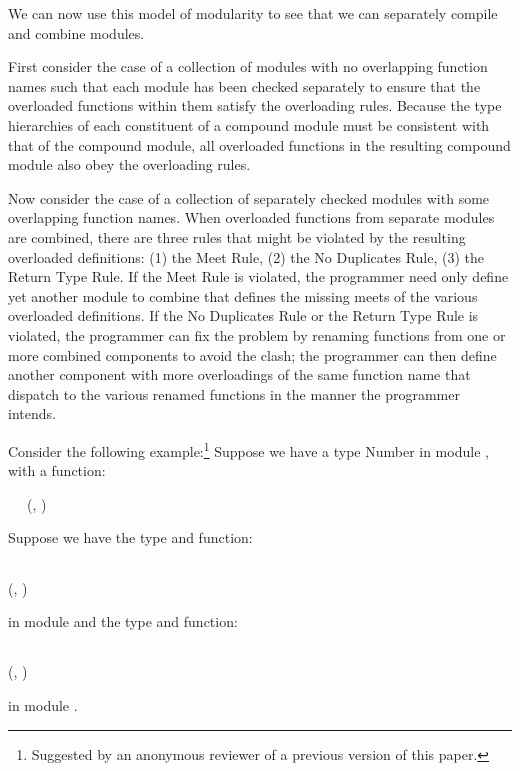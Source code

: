 \documentclass[10pt]{sigplanconf}
\begin{document}
We can now use this model of modularity to see 
that we can separately compile and combine modules.

First consider the case of a collection of modules with no overlapping function names
such that each module has been checked separately 
to ensure that the overloaded functions within them satisfy the overloading rules.
Because the type hierarchies of each constituent of a compound module 
must be consistent with that of the compound module, 
all overloaded functions in the resulting compound module
also obey the overloading rules.

Now consider the case of a collection of separately checked modules 
with some overlapping function names.
When overloaded functions from separate modules are combined, 
there are three rules that might be violated
by the resulting overloaded definitions: 
(1) the Meet Rule, (2) the No Duplicates Rule, (3) the Return Type Rule.
If the Meet Rule is violated, 
the programmer need only define yet another module to combine 
that defines the missing meets of the various overloaded definitions.
If the No Duplicates Rule or the Return Type Rule is violated, 
the programmer can fix the problem by renaming functions 
from one or more combined components to avoid the clash; 
the programmer can then define another component 
with more overloadings of the same function name 
that dispatch to the various renamed functions in the manner the programmer intends.

Consider the following example:\footnote{Suggested by 
an anonymous reviewer of a previous version of this paper.}
Suppose we have a type Number in module , with a
function:
\begin{FortressCode}
{\tt ~~}\+ \COLONOP (, ) \rightarrow {}\-
\end{FortressCode}
Suppose we have the type and function:
\begin{FortressCode}
{\tt ~~}\+ \SHORTCUT{<}  \\
   \COLONOP (, ) \rightarrow {}\-
\end{FortressCode}
in module  and the type and function:
\begin{FortressCode}
{\tt ~~}\+ \SHORTCUT{<}  \\
   \COLONOP (, ) \rightarrow {}\-
\end{FortressCode}
in module .
\end{document}
